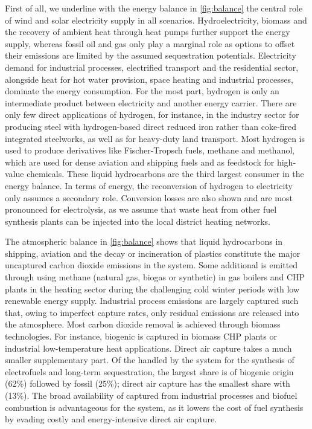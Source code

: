 First of all, we underline with the energy balance in \cref{fig:balance} the
central role of wind and solar electricity supply in all scenarios.
Hydroelectricity, biomass and the recovery of ambient heat through heat pumps
further support the energy supply, whereas fossil oil and gas only play a
marginal role as options to offset their emissions are limited by the assumed
sequestration potentials. Electricity demand for industrial processes,
electrified transport and the residential sector, alongside heat for hot water
provision, space heating and industrial processes, dominate the energy
consumption. For the most part, hydrogen is only an intermediate product between
electricity and another energy carrier. There are only few direct applications
of hydrogen, for instance, in the industry sector for producing steel with
hydrogen-based direct reduced iron rather than coke-fired integrated steelworks,
as well as for heavy-duty land transport. Most hydrogen is used to produce
derivatives like Fischer-Tropsch fuels, methane and methanol, which are used for
dense aviation and shipping fuels and as feedstock for high-value chemicals.
These liquid hydrocarbons are the third largest consumer in the energy balance.
In terms of energy, the reconversion of hydrogen to electricity only assumes a
secondary role. Conversion losses are also shown and are most pronounced for
electrolysis, as we assume that waste heat from other fuel synthesis plants can
be injected into the local district heating networks.

The atmospheric \co balance in \cref{fig:balance} shows that liquid hydrocarbons
in shipping, aviation and the decay or incineration of plastics constitute the
major uncaptured carbon dioxide emissions in the system. Some additional \co is
emitted through using methane (natural gas, biogas or synthetic) in gas boilers
and CHP plants in the heating sector during the challenging cold winter periods
with low renewable energy supply. Industrial process emissions are largely
captured such that, owing to imperfect capture rates, only residual emissions
are released into the atmosphere. Most carbon dioxide removal is achieved
through biomass technologies. For instance, biogenic \co is captured in biomass
CHP plants or industrial low-temperature heat applications. Direct air capture
takes a much smaller supplementary part. Of the \co handled by the system for
the synthesis of electrofuels and long-term sequestration, the largest share is
of biogenic origin (62\%) followed by fossil \co (25\%); direct air capture has
the smallest share with (13\%). The broad availability of captured \co from
industrial processes and biofuel combustion is advantageous for the system, as
it lowers the cost of fuel synthesis by evading costly and energy-intensive
direct air capture.

